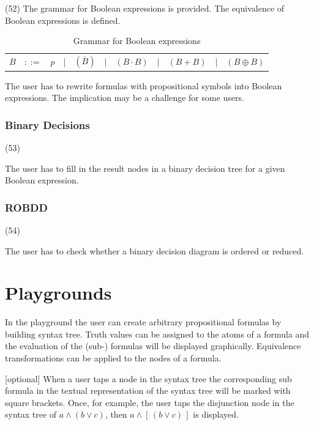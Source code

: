 (52) The grammar for Boolean expressions is provided. 
The equivalence of Boolean expressions is defined.

\begin{table}[htdp]
\begin{center}
\begin{tabular}{rcccccccccc}
$B$	&$::=$	&$p$ 	
	&|		& $(\overline{B})$ 
	&|		&  $(B \cdot B)$ 
	&|		&  $(B + B)$ 
	&|		&  $(B \oplus B)$ \\
\end{tabular}
\caption{Grammar for Boolean expressions}
\label{tab:BNFGRBE}
\end{center}
\end{table}

The user has to rewrite formulas with propositional symbols into Boolean expressions.
The implication may be a challenge for some users. 

\subsubsection{Binary Decisions}
\label{tut:53}

(53)

The user has to fill in the result nodes in a binary decision tree for a given Boolean expression.

\subsubsection{ROBDD}
\label{tut:54}

(54)

The user has to check whether a binary decision diagram is ordered or reduced.

\section{Playgrounds}

In the playground the user can create arbitrary propositional formulas 
by building syntax tree.
Truth values can be assigned to the atoms of a formula and 
the evaluation of the (sub-) formulas will be displayed graphically.
Equivalence transformations can be applied to the nodes of a formula.

[optional]
When a user taps a node in the syntax tree the corresponding sub formula 
in the textual representation of the syntax tree will be marked with square brackets.
Once, for example,  the user taps the disjunction node in the syntax tree of 
$a \wedge (b \vee c) $, then
$a \wedge [\,(b \vee c) \,]$ is displayed.

